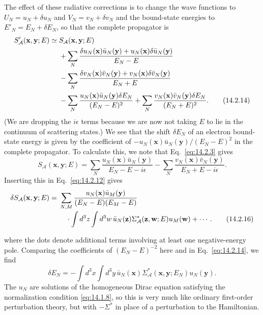 The effect of these radiative corrections is to change the wave functions to
$U_N=u_N+\delta u_N$ and $V_N=v_N+\delta v_N$ and the bound-state energies to
$E'_N=E_N+\delta E_N$, so that the complete propagator is
\begin{align}
 S'_{\mathcal A}(\mathbf x,\mathbf y;E)\simeq{}&S_{\mathcal A}(\mathbf x,\mathbf y;E)
 \notag\\
 &+\sum_N\frac{\delta u_N(\mathbf x)\bar u_N(\mathbf y)
 +u_N(\mathbf x)\delta\bar u_N(\mathbf y)}{E_N-E}
 \notag\\
 &-\sum_N\frac{\delta v_N(\mathbf x)\bar v_N(\mathbf y)
 +v_N(\mathbf x)\delta\bar v_N(\mathbf y)}{E_N+E}
 \notag\\
 &-\sum_N\frac{u_N(\mathbf x)\bar u_N(\mathbf y)\delta E_N}{(E_N-E)^2}
 +\sum_N\frac{v_N(\mathbf x)\bar v_N(\mathbf y)\delta E_N}{(E_N+E)^2}.
 \tag{14.2.14}\label{eq:14.2.14}
\end{align}
(We are dropping the $i\epsilon$ terms because we are now not taking $E$ to lie
in the continuum of scattering states.) We see that the shift $\delta E_N$ of
an electron bound-state energy is given by the coefficient of
$-u_N(\mathbf x)\bar u_N(\mathbf y)/(E_N-E)^2$ in the complete propagator. To
calculate this, we note that Eq.~\eqref{eq:14.2.3} gives
\begin{equation}
 S_{\mathcal A}(\mathbf x,\mathbf y;E)
 =\sum_N\frac{u_N(\mathbf x)\bar u_N(\mathbf y)}{E_N-E-i\epsilon}
 -\sum_N\frac{v_N(\mathbf x)\bar v_N(\mathbf y)}{E_N+E-i\epsilon}.
 \tag{14.2.15}\label{eq:14.2.15}
\end{equation}
Inserting this in Eq.~\eqref{eq:14.2.12} gives
\begin{align}
 \delta S_{\mathcal A}(\mathbf x,\mathbf y;E)={}&
 \sum_{N,M}\frac{u_N(\mathbf x)\bar u_M(\mathbf y)}{(E_N-E)(E_M-E)}
 \notag\\[-2pt]
 &\quad\cdot\int d^3z\int d^3w\,
 \bar u_N(\mathbf z)\Sigma^*_{\mathcal A}(\mathbf z,\mathbf w;E)
 u_M(\mathbf w)+\cdots .
 \tag{14.2.16}\label{eq:14.2.16}
\end{align}



where the dots denote additional terms involving at least one negative-energy
pole. Comparing the coefficients of $(E_N-E)^{-2}$ here and in
Eq.~\eqref{eq:14.2.14}, we find
\begin{equation}
 \delta E_N=-\int d^3x\int d^3y\,
 \bar u_N(\mathbf x)\Sigma^*_{\mathcal A}(\mathbf x,\mathbf y;E_N)u_N(\mathbf y).
 \tag{14.2.17}\label{eq:14.2.17}
\end{equation}
The $u_N$ are solutions of the homogeneous Dirac equation satisfying the
normalization condition \eqref{eq:14.1.8}, so this is very much like ordinary
first-order perturbation theory, but with $-\Sigma^*$ in place of a perturbation
to the Hamiltonian.

